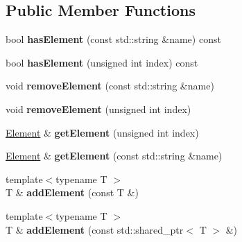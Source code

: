 \subsection*{Public Member Functions}
\begin{DoxyCompactItemize}
\item 
\mbox{\label{classbkengine_1_1Scene_a3127e57e1ff42edb9c3cda34d27249c2}} 
bool {\bfseries has\+Element} (const std\+::string \&name) const
\item 
\mbox{\label{classbkengine_1_1Scene_afe21a71bdcef366a6e6be0779db675d7}} 
bool {\bfseries has\+Element} (unsigned int index) const
\item 
\mbox{\label{classbkengine_1_1Scene_a6b9eddaef6e6f1e5845627a27f4c0855}} 
void {\bfseries remove\+Element} (const std\+::string \&name)
\item 
\mbox{\label{classbkengine_1_1Scene_a96c7a8bf8b818bb718a82410ed930997}} 
void {\bfseries remove\+Element} (unsigned int index)
\item 
\mbox{\label{classbkengine_1_1Scene_a6bdf98fd9bef98e82744d92915651ec7}} 
\hyperlink{classbkengine_1_1Element}{Element} \& {\bfseries get\+Element} (unsigned int index)
\item 
\mbox{\label{classbkengine_1_1Scene_a9023f6c7dd5dd75ea1b0410265f06d5e}} 
\hyperlink{classbkengine_1_1Element}{Element} \& {\bfseries get\+Element} (const std\+::string \&name)
\item 
\mbox{\label{classbkengine_1_1Scene_a2750a0b50166349395b8c0a31f34a414}} 
{\footnotesize template$<$typename T $>$ }\\T \& {\bfseries add\+Element} (const T \&)
\item 
\mbox{\label{classbkengine_1_1Scene_acbb42fedce808f75e0f82e59f3bfa43c}} 
{\footnotesize template$<$typename T $>$ }\\T \& {\bfseries add\+Element} (const std\+::shared\+\_\+ptr$<$ T $>$ \&)
\item 
\mbox{\label{classbkengine_1_1Scene_af5481a1f876f29a0ef178e8fb583d0b2}} 

\end{DoxyCompactItemize}
